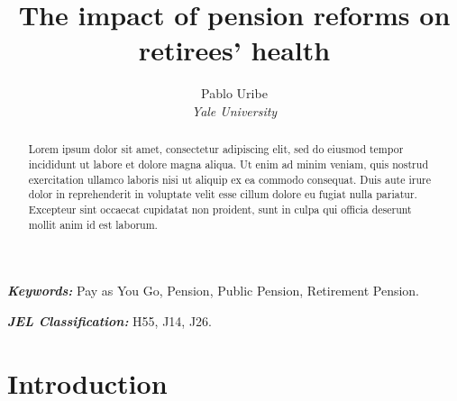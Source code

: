 \documentclass[12pt, a4paper]{article}
\begin{document}
\renewcommand{\BOthers}[1]{et al.\hbox{}}
\newcommand\fnote[1]{\captionsetup{font=footnotesize}\caption*{#1}}

\newcommand{\xxx}[2][show]{ %
 \ifthenelse{\equal{#1}{show} }{ \textcolor{red}{X #2 X}}{}}

\title{\Large \textbf{The impact of pension reforms on retirees' health}}
\author{Pablo Uribe \\ \small \textit{Yale University}} 
\maketitle
\thispagestyle{empty}
\vspace{-0.5cm}


\begin{abstract}
    
Lorem ipsum dolor sit amet, consectetur adipiscing elit, sed do eiusmod tempor incididunt ut labore et dolore magna aliqua. Ut enim ad minim veniam, quis nostrud exercitation ullamco laboris nisi ut aliquip ex ea commodo consequat. Duis aute irure dolor in reprehenderit in voluptate velit esse cillum dolore eu fugiat nulla pariatur. Excepteur sint occaecat cupidatat non proident, sunt in culpa qui officia deserunt mollit anim id est laborum.

\end{abstract}


\textit{\textbf{Keywords:}} Pay as You Go, Pension, Public Pension, Retirement Pension.

\vspace{0.5cm}
\textit{\textbf{JEL Classification:}} H55, J14, J26.

\vspace{.5cm}

\newpage
\setcounter{page}{1}
\section{Introduction}
\end{document}
